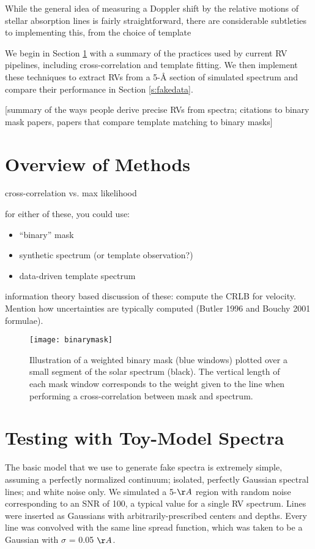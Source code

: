 \documentclass[modern]{aastex61}
\begin{document}
While the general idea of measuring a Doppler shift by the relative motions of stellar absorption lines is fairly straightforward, there are considerable subtleties to implementing this, from the choice of template 

We begin in Section \ref{s:methods} with a summary of the practices used by current RV pipelines, including cross-correlation and template fitting. We then implement these techniques to extract RVs from a 5-\r{A} section of simulated spectrum and compare their performance in Section \ref{s:fakedata}. 

[summary of the ways people derive precise RVs from spectra; citations to binary mask papers, papers that compare template matching to binary masks]

\section{Overview of Methods}
\label{s:methods}

cross-correlation vs. max likelihood

for either of these, you could use:
\begin{itemize}
\item ``binary'' mask
\item synthetic spectrum (or template observation?)
\item data-driven template spectrum
\end{itemize}

information theory based discussion of these: compute the CRLB for velocity. Mention how uncertainties are typically computed (Butler 1996 and Bouchy 2001 formulae).

\begin{figure}
\centering
\texttt{[image: binarymask]}
\caption{Illustration of a weighted binary mask (blue windows) plotted over a small segment of the solar spectrum (black). The vertical length of each mask window corresponds to the weight given to the line when performing a cross-correlation between mask and spectrum.}
\label{fig:binarymask}
\end{figure}


\section{Testing with Toy-Model Spectra}

The basic model that we use to generate fake spectra is extremely simple, assuming a perfectly normalized continuum; isolated, perfectly Gaussian spectral lines; and white noise only. We simulated a 5-$\AA$ region with random noise corresponding to an SNR of 100, a typical value for a single RV spectrum. Lines were inserted as Gaussians with arbitrarily-prescribed centers and depths. Every line was convolved with the same line spread function, which was taken to be a Gaussian with $\sigma$ = 0.05 $\AA$.
\end{document}
